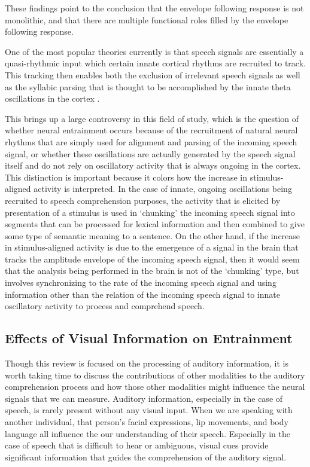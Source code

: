 \documentclass[titlepage]{article}
\begin{document}
    These findings point to the conclusion that the envelope following response
    is not monolithic, and that there are multiple functional roles filled by
    the envelope following response.

    One of the most popular theories currently is that speech signals are
    essentially a quasi-rhythmic input which certain innate cortical rhythms are
    recruited to track. This tracking then enables both the exclusion of
    irrelevant speech signals \cite{Horton2014,OSullivan2015} as well as the
    syllabic parsing that is thought to be accomplished by the innate theta
    oscillations in the cortex \cite{Doelling2014,Ghitza2013b}.

    This brings up a large controversy in this field of study, which is the
    question of whether neural entrainment occurs because of the recruitment of
    natural neural rhythms that are simply used for alignment and parsing of the
    incoming speech signal, or whether these oscillations are actually
    generated by the speech signal itself and do not rely on oscillatory
    activity that is always ongoing in the cortex. This distinction is
    important because it colors how the increase in stimulus-aligned activity
    is interpreted. In the case of innate, ongoing oscillations being recruited
    to speech comprehension purposes, the activity that is elicited by
    presentation of a stimulus is used in `chunking' the incoming speech signal
    into segments that can be processed for lexical information and then
    combined to give some type of semantic meaning to a sentence. On the other
    hand, if the increase in stimulus-aligned activity is due to the
    emergence of a signal in the brain that tracks the amplitude envelope of
    the incoming speech signal, then it would seem that the analysis being
    performed in the brain is not of the `chunking' type, but involves
    synchronizing to the rate of the incoming speech signal and using
    information other than the relation of the incoming speech signal to
    innate oscillatory activity to process and comprehend speech.

  \subsection{Effects of Visual Information on Entrainment}

    Though this review is focused on the processing of auditory information, it
    is worth taking time to discuss the contributions of other modalities to
    the auditory comprehension process and how those other modalities might
    influence the neural signals that we can measure. Auditory information,
    especially in the case of speech, is rarely present without any visual
    input. When we are speaking with another individual, that person's facial
    expressions, lip movements, and body language all influence the our
    understanding of their speech. Especially in the case of speech that is
    difficult to hear or ambiguous, visual cues provide significant information
    that guides the comprehension of the auditory signal.
\end{document}
